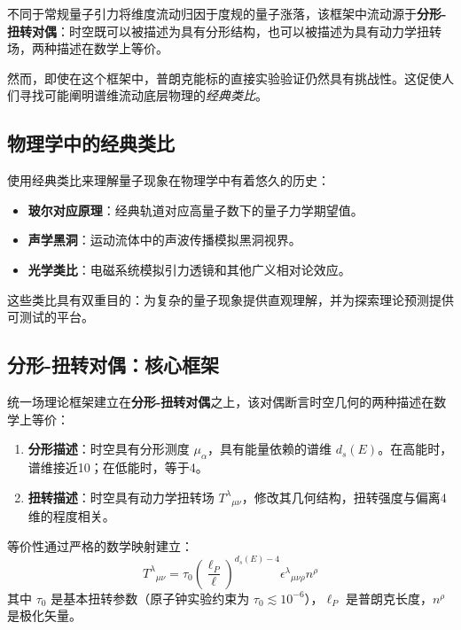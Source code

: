 \documentclass[12pt,a4paper]{article}
\begin{document}
不同于常规量子引力将维度流动归因于度规的量子涨落，该框架中流动源于\textbf{分形-扭转对偶}：时空既可以被描述为具有分形结构，也可以被描述为具有动力学扭转场，两种描述在数学上等价。

然而，即使在这个框架中，普朗克能标的直接实验验证仍然具有挑战性。这促使人们寻找可能阐明谱维流动底层物理的\textit{经典类比}。

\subsection{物理学中的经典类比}

使用经典类比来理解量子现象在物理学中有着悠久的历史：

\begin{itemize}
    \item \textbf{玻尔对应原理}：经典轨道对应高量子数下的量子力学期望值。
    \item \textbf{声学黑洞}：运动流体中的声波传播模拟黑洞视界。
    \item \textbf{光学类比}：电磁系统模拟引力透镜和其他广义相对论效应。
\end{itemize}

这些类比具有双重目的：为复杂的量子现象提供直观理解，并为探索理论预测提供可测试的平台。

\subsection{分形-扭转对偶：核心框架}

统一场理论框架建立在\textbf{分形-扭转对偶}之上，该对偶断言时空几何的两种描述在数学上等价：

\begin{enumerate}
    \item \textbf{分形描述}：时空具有分形测度 $\mu_\alpha$，具有能量依赖的谱维 $d_s(E)$。在高能时，谱维接近10；在低能时，等于4。
    \item \textbf{扭转描述}：时空具有动力学扭转场 $T^\lambda{}_{\mu\nu}$，修改其几何结构，扭转强度与偏离4维的程度相关。
\end{enumerate}

等价性通过严格的数学映射建立：
\begin{equation}
    T^\lambda{}_{\mu\nu} = \tau_0 \left(\frac{\ell_P}{\ell}\right)^{d_s(E)-4} \epsilon^\lambda{}_{\mu\nu\rho} n^\rho
    \label{eq:duality_map}
\end{equation}
其中 $\tau_0$ 是基本扭转参数（原子钟实验约束为 $\tau_0 \lesssim 10^{-6}$），$\ell_P$ 是普朗克长度，$n^\rho$ 是极化矢量。
\end{document}
